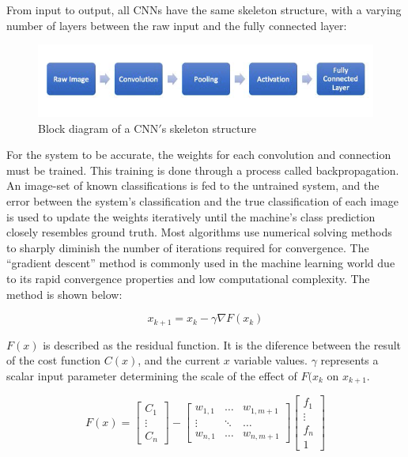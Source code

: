 \documentclass[12pt]{drexelthesis}
\begin{document}
From input to output, all CNNs have the same skeleton structure, with a varying number of layers between the raw input and the fully connected layer:

\begin{figure}[!ht]
	\centering
		\includegraphics[width=6in]{cnn_flow.png} 
	\caption[Block diagram of CNN flow]{\centering Block diagram of a CNN$'$s skeleton structure}
\end{figure}

For the system to be accurate, the weights for each convolution and connection must be trained. This training is done through a process called backpropagation. An image-set of known classifications is fed to the untrained system, and the error between the system’s classification and the true classification of each image is used to update the weights iteratively until the machine’s class prediction closely resembles ground truth. Most algorithms use numerical solving methods to sharply diminish the number of iterations required for convergence. The “gradient descent” method is commonly used in the machine learning world due to its rapid convergence properties and low computational complexity. The method is shown below:

\begin{equation}
	x_{k+1} = x_{k} - \gamma \nabla F(x_{k})
\end{equation}

$F(x)$ is described as the residual function. It is the diference between the result of the cost function $C(x)$, and the current $x$ variable values. $\gamma$ represents a scalar input parameter determining the scale of the effect of $F(x_{k}$ on $x_{k+1}$.

\begin{equation}
 F(x) =
\begin{bmatrix}
C_{1} \\
\vdots \\
C_{n}
\end{bmatrix}  -  \begin{bmatrix} w_{1,1} & \hdots & w_{1,m+1} \\ \vdots & \ddots & \hdots \\ w_{n,1} & \hdots & w_{n, m+1} \end{bmatrix}  \begin{bmatrix} f_{1} \\ \vdots \\ f_{n} \\ 1 \end{bmatrix} 
\end{equation}
\end{document}
